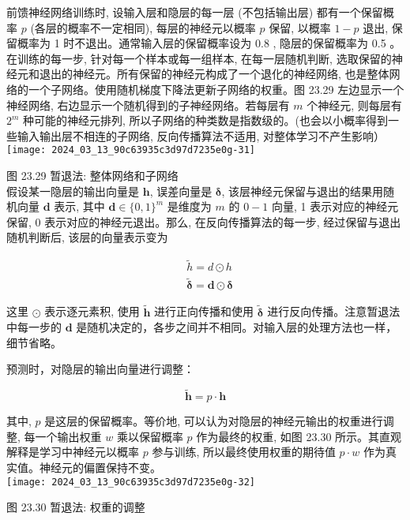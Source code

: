 \documentclass[10pt]{article}
\begin{document}
\begin{CJK*}{UTF8}{bsmi}
前馈神经网络训练时, 设输入层和隐层的每一层 (不包括输出层) 都有一个保留概率 $p$ (各层的概率不一定相同), 每层的神经元以概率 $p$ 保留, 以概率 $1-p$ 退出, 保留概率为 1 时不退出。通常输入层的保留概率设为 0.8 , 隐层的保留概率为 0.5 。在训练的每一步, 针对每一个样本或每一组样本, 在每一层随机判断, 选取保留的神经元和退出的神经元。所有保留的神经元构成了一个退化的神经网络, 也是整体网络的一个子网络。使用随机梯度下降法更新子网络的权重。图 23.29 左边显示一个神经网络, 右边显示一个随机得到的子神经网络。若每层有 $m$ 个神经元, 则每层有 $2^{m}$ 种可能的神经元排列, 所以子网络的种类数是指数级的。(也会以小概率得到一些输入输出层不相连的子网络, 反向传播算法不适用, 对整体学习不产生影响）\\
\texttt{[image: 2024\_03\_13\_90c63935c3d97d7235e0g-31]}

图 23.29 暂退法: 整体网络和子网络\\
假设某一隐层的输出向量是 $\boldsymbol{h}$, 误差向量是 $\boldsymbol{\delta}$, 该层神经元保留与退出的结果用随机向量 $\boldsymbol{d}$ 表示, 其中 $\boldsymbol{d} \in\{0,1\}^{m}$ 是维度为 $m$ 的 $0-1$ 向量, 1 表示对应的神经元保留, 0 表示对应的神经元退出。那么, 在反向传播算法的每一步, 经过保留与退出随机判断后, 该层的向量表示变为


\begin{align*}
& \tilde{h}=d \odot h  \tag{23.69}\\
& \tilde{\boldsymbol{\delta}}=\boldsymbol{d} \odot \boldsymbol{\delta} \tag{23.70}
\end{align*}


这里 $\odot$ 表示逐元素积, 使用 $\tilde{\boldsymbol{h}}$ 进行正向传播和使用 $\tilde{\boldsymbol{\delta}}$ 进行反向传播。注意暂退法中每一步的 $\boldsymbol{d}$ 是随机决定的，各步之间并不相同。对输入层的处理方法也一样，细节省略。

预测时，对隐层的输出向量进行调整：


\begin{equation*}
\tilde{\boldsymbol{h}}=p \cdot \boldsymbol{h} \tag{23.71}
\end{equation*}


其中, $p$ 是这层的保留概率。等价地, 可以认为对隐层的神经元输出的权重进行调整, 每一个输出权重 $w$ 乘以保留概率 $p$ 作为最终的权重, 如图 23.30 所示。其直观解释是学习中神经元以概率 $p$ 参与训练, 所以最终使用权重的期待值 $p \cdot w$ 作为真实值。神经元的偏置保持不变。\\
\texttt{[image: 2024\_03\_13\_90c63935c3d97d7235e0g-32]}

图 23.30 暂退法: 权重的调整


\end{CJK*}
\end{document}
